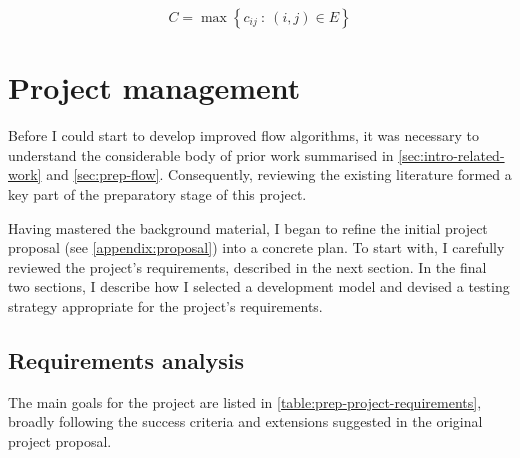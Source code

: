 \begin{equation}
C=\max\left\{ c_{ij}\::\:(i,j)\in E\right\} 
\end{equation}

\section{Project management}

Before I could start to develop improved flow algorithms, it was necessary to understand the considerable body of prior work  summarised in \cref{sec:intro-related-work} and \cref{sec:prep-flow}. Consequently, reviewing the existing literature formed a key part of the preparatory stage of this project. 

Having mastered the background material, I began to refine the initial project proposal (see \cref{appendix:proposal}) into a concrete plan. To start with, I carefully reviewed the project's requirements, described in the next section. In the final two sections, I describe how I selected a development model and devised a testing strategy appropriate for the project's requirements.

\subsection{Requirements analysis} \label{sec:prep-management-requirements}



The main goals for the project are listed in \cref{table:prep-project-requirements}, broadly following the success criteria and extensions suggested in the original project proposal.

